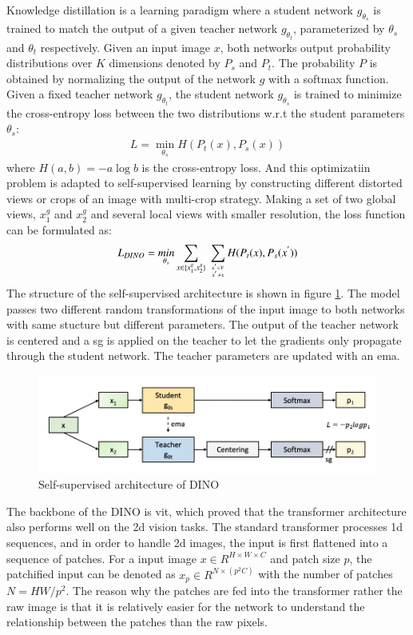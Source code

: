 \documentclass[12pt,DIV14,BCOR12mm,a4paper,footinclude=false,headinclude,parskip=half-,twoside,openright,cleardoublepage=empty,toc=index,bibliography=totoc,listof=totoc]{scrreprt}
\numberwithin{equation}{chapter}
\begin{document}
Knowledge distillation is a learning paradigm where a student network $g_{\theta_{s}}$ is trained to match the output of a given teacher network $g_{\theta_{t}}$, parameterized by $\theta_{s}$ and $\theta_{t}$ respectively. Given an input image $x$, both networks output probability distributions over $K$ dimensions denoted by $P_{s}$ and $P_{t}$. The probability $P$ is obtained by normalizing the output of the network $g$ with a softmax function. Given a fixed teacher network $g_{\theta_{t}}$, the student network $g_{\theta_{s}}$ is trained to minimize the cross-entropy loss between the two distributions w.r.t the student parameters $\theta_{s}$:
\begin{align}
  L = \mathop{min}_{\theta_{s}}H(P_{t}(x), P_{s}(x))
\end{align}
where $H(a,b)=-a \log b$ is the cross-entropy loss. And this optimizatiin problem is adapted to self-supervised learning by constructing different distorted views or crops of an image with multi-crop strategy. Making a set of two global views, $x_{1}^{g}$ and $x_{2}^{g}$ and several local views with smaller resolution, the loss function can be formulated as:
\begin{align}
  L_{DINO}=\mathop{min}_{\theta_{s}}\mathop{\sum}_{x\in \{x_{1}^{g},x_{2}^{g}\}} \ \mathop{\sum}_{x^{'}\in V \atop x^{'}\neq x}H(P_{t}(x), P_{s}(x^{'}))
\end{align}
The structure of the self-supervised architecture is shown in figure \ref{img:dino}. The model passes two different random transformations of the input image to both networks with same stucture but different parameters. The output of the teacher network is centered and a \gls{sg} is applied on the teacher to let the gradients only propagate through the student network. The teacher parameters are updated with an \gls{ema}.
\begin{figure}[h]
	\centering
	\includegraphics[scale=.38]{img/dino.png}
	\caption{Self-supervised architecture of DINO}
	\label{img:dino}
\end{figure}

The backbone of the DINO is \gls{vit}\cite{dosovitskiy2021image}, which proved that the transformer architecture also performs well on the \gls{2d} vision tasks. The standard transformer processes \gls{1d} sequences, and in order to handle \gls{2d} images, the input is first flattened into a sequence of patches. For a input image $x\in R^{H\times W\times C}$ and patch size $p$, the patchified input can be denoted as $x_p\in R^{N\times(p^{2}C)}$ with the number of patches $N=HW/{p^{2}}$. The reason why the patches are fed into the transformer rather the raw image is that it is relatively easier for the network to understand the relationship between the patches than the raw pixels.
\end{document}
